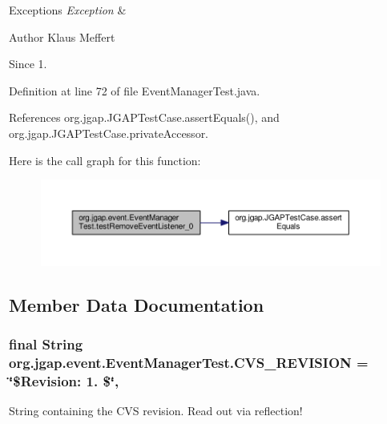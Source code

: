 \begin{DoxyExceptions}{Exceptions}
{\em Exception} & \\
\hline
\end{DoxyExceptions}
\begin{DoxyAuthor}{Author}
Klaus Meffert 
\end{DoxyAuthor}
\begin{DoxySince}{Since}
1. 
\end{DoxySince}


Definition at line 72 of file Event\-Manager\-Test.\-java.



References org.\-jgap.\-J\-G\-A\-P\-Test\-Case.\-assert\-Equals(), and org.\-jgap.\-J\-G\-A\-P\-Test\-Case.\-private\-Accessor.



Here is the call graph for this function\-:
\nopagebreak
\begin{figure}[H]
\begin{center}
\leavevmode
\includegraphics[width=350pt]{classorg_1_1jgap_1_1event_1_1_event_manager_test_a5111644d04877323b723bc31d9ad3338_cgraph}
\end{center}
\end{figure}




\subsection{Member Data Documentation}
\hypertarget{classorg_1_1jgap_1_1event_1_1_event_manager_test_a78aa41417574f49b0c43044c352cf94c}{
\subsubsection[{C\-V\-S\-\_\-\-R\-E\-V\-I\-S\-I\-O\-N}]{\setlength{\rightskip}{0pt plus 5cm}final String org.\-jgap.\-event.\-Event\-Manager\-Test.\-C\-V\-S\-\_\-\-R\-E\-V\-I\-S\-I\-O\-N = \char`\"{}\$Revision\-: 1. \$\char`\"{}\hspace{0.3cm}{\ttfamily [static]}, {\ttfamily [private]}}}\label{classorg_1_1jgap_1_1event_1_1_event_manager_test_a78aa41417574f49b0c43044c352cf94c}
String containing the C\-V\-S revision. Read out via reflection! 


